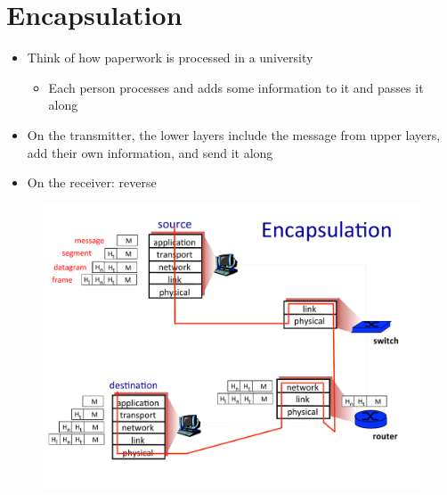 \section{Encapsulation}
\begin{itemize}[nosep]
    \item Think of how paperwork is processed in a university
          \begin{itemize}[nosep]
              \item Each person processes and adds some information to it and passes it along
          \end{itemize}
    \item On the transmitter, the lower layers include the message from upper layers, add their own information, and send it along
    \item On the receiver: reverse
\end{itemize}
\begin{figure}[H]
    \includegraphics[width=\textwidth]{lazy/encapsulation.pdf}
\end{figure}